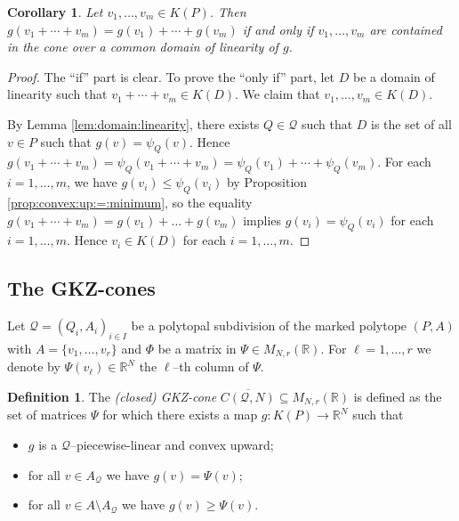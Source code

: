 \documentclass[12pt, a4article]{amsart}   	%
\numberwithin{equation}{section}
\theoremstyle{plain}
\newtheorem{corollary}[theorem]{Corollary}
\theoremstyle{definition}
\newtheorem{definition}[theorem]{Definition}
\newcommand{\R}{{\mathbb R}}
\newcommand{\mcQ}{{\mathcal Q}}
\newcommand{\MNaR}{M_{N,r}(\R)}
\begin{document}
\begin{corollary}\label{cor:linearity:only:in:domain}
    Let $v_1,\ldots,v_m \in K(P)$. Then $g(v_1 + \cdots + v_m) = g(v_1) + \cdots + g(v_m)$ if and only if $v_1,\ldots,v_m$ are contained in the cone over a common domain of linearity of $g$.
\end{corollary}
\begin{proof}
The ``if'' part is clear. To prove the ``only if'' part, let $D$ be a domain of linearity such that $v_1 + \cdots + v_m\in K(D)$. We claim that $v_1,\ldots,v_m\in K(D)$.

By Lemma \ref{lem:domain:linearity}, there exists $Q\in \mathcal Q$ such that $D$ is the set of all $v\in P$ such that $g(v) = \psi_Q(v)$. Hence $g(v_1 + \cdots + v_m) = \psi_Q(v_1 + \cdots + v_m) = \psi_Q(v_1) + \cdots + \psi_Q(v_m)$. For each $i=1,\ldots,m$, we have $g(v_i)\leq \psi_Q(v_i)$ by Proposition \ref{prop:convex:up:=:minimum}, so the equality $g(v_1 + \cdots + v_m) = g(v_1) + \dots + g(v_m)$ implies $g(v_i) = \psi_Q(v_i)$ for each $i=1,\ldots,m$. Hence $v_i\in K(D)$ for each $i=1,\ldots,m$.
\end{proof}



\subsection{The GKZ-cones}

Let $\mathcal Q=(Q_i,A_i)_{i\in I}$ be a polytopal subdivision of the marked polytope $(P, A)$ with $A=\{v_1,\ldots,v_r\}$ and $\Phi$ be a matrix in $\Psi\in\MNaR$. For $\ell=1,\ldots,r$ we denote by $\Psi(v_\ell)\in\mathbb{R}^N$ the $\ell$--th column of $\Psi$. 

\begin{definition}\label{def:gkz:close:cone}
    The \emph{(closed) GKZ-cone} $\overline{C(\mcQ,N)}\subseteq \MNaR$ is defined as the set of matrices $\Psi$ for which there exists a map $g:K(P)\to\R^N$ such that
    \begin{itemize}
        \item[(1)] $g$ is a $\mcQ$--piecewise-linear and convex upward;
        \item[(2)] for all $v\in A_\mcQ$ we have $g(v) = \Psi(v)$;
        \item[(3)] for all $v\in A\setminus A_\mcQ$ we have $g(v) \geq \Psi(v)$. 
    \end{itemize}
\end{definition}
\end{document}
